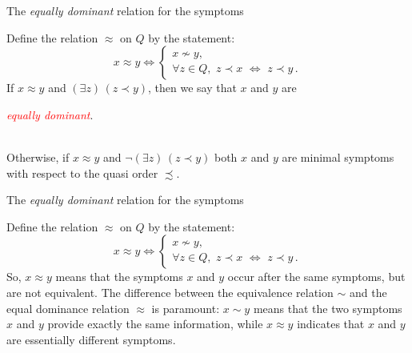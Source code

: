 \documentclass{beamer}
\def\tl{\vskip 2mm}
\def\EQ{\Longleftrightarrow}
\def\eq{\Leftrightarrow}
\def\rtxt#1{\textcolor{red}{#1}}
\begin{document}
\begin{frame}{The {\sl equally dominant} relation for  the symptoms}
\begin{definition}
\tl
\center
\begin{minipage}{11cm}
Define the relation $\approx$ on $Q$ by the statement:
$$
x\approx y \EQ \begin{cases} x\not\sim y,\\
\forall z\in Q, \,\, z\prec x\,\,\eq\,\, z\prec y\,.
\end{cases}
$$
If $x\approx y$ and $(\exists z)\, (z\prec y)$, then we say that $x$ and $y$ are\\[1mm]
\centerline{ \rtxt{\sl equally dominant}.}\\[1mm]
 Otherwise, if $x\approx y$ and  $\neg(\exists z)\, (z\prec y)$ both $x$ and $y$ are minimal symptoms with respect to the quasi order $\precsim$.

\end{minipage}
\tl
\end{definition}
 \vspace{.5cm}

\end{frame}
\begin{frame}{The {\sl equally dominant} relation for  the symptoms}

\begin{definition}
\tl
\center
\begin{minipage}{11cm}
Define the relation $\approx$ on $Q$ by the statement:
$$
x\approx y \EQ \begin{cases} x\not\sim y,\\
\forall z\in Q, \,\, z\prec x\,\,\eq\,\, z\prec y\,.
\end{cases}
$$
So, $x\approx y$ means that the symptoms  $x$ and $y$ occur after the same symptoms, but are not equivalent. 
\tl
The difference between the equivalence relation $\sim$ and the equal dominance relation $\approx$ is paramount: $x\sim y$ 
means that the two symptoms $x$ and $y$ provide exactly the same information, while $x\approx y$ indicates that $x$ and $y$  are essentially different symptoms.
\end{minipage}
\tl
\end{definition}
 \vspace{.5cm}

\end{frame}
\end{document}
